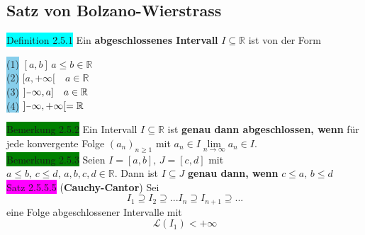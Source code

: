 \documentclass[landscape, 10pt]{article}
\newcommand{\R}{\mathbb{R}}
\begin{document}
\begin{multicols}{3}
       \subsection{Satz von Bolzano-Wierstrass}
              \colorbox{cyan}{Definition 2.5.1} 
                     Ein \textbf{abgeschlossenes Intervall} 
                     $I\subseteq\R$ ist von der Form
                     \begin{multicols}{2} %
                     \colorbox{SkyBlue}{(1)} 
                            $[a,b]\, a\leqslant b\in\R$\\
                     \colorbox{SkyBlue}{(2)}
                            $[a,+\infty[\quad a\in\R$\\
                     \colorbox{SkyBlue}{(3)}
                            $]\scalebox{0.75}[1.0]{\(-\)}\infty,a]\quad a\in\R$\\
                     \colorbox{SkyBlue}{(4)} 
                            $]\scalebox{0.75}[1.0]{\(-\)}\infty,+\infty[=\R$
                     \end{multicols}
              \colorbox{green}{Bemerkung 2.5.2} 
                     Ein Intervall $I\subseteq\R$ ist \textbf{genau dann 
                     abgeschlossen, wenn} für jede konvergente Folge 
                     $(a_n)_{n\geqslant1}$ 
                     mit \textcolor{NavyBlue}{
                     $a_n\in I$\quad$\lim\limits_{n\to\infty}a_n\in I$}.\\
              \colorbox{green}{Bemerkung 2.5.3}
                     Seien $I=[a,b],\,J=[c,d]$ mit \\
                     \textcolor{NavyBlue}{
                     $a\leqslant b,\,c\leqslant d,\,a,b,c,d\in\R$}. 
                     Dann ist 
                     \textcolor{NavyBlue}{$I\subseteq J$} \textbf{genau dann, 
                     wenn} \textcolor{NavyBlue}{$c\leqslant a,\,b\leqslant d$}\\
              \colorbox{magenta}{Satz 2.5.5.5} 
              (\textbf{Cauchy-Cantor}) 
                     Sei
                     \begin{equation*}
                            I_1\supseteq I_2\supseteq ...I_n\supseteq 
                            I_{n+1}\supseteq ...
                     \end{equation*}
                     eine Folge 
                     abgeschlossener Intervalle mit 
                     \begin{equation*}
                            \mathcal{L}(I_1)<+\infty

\end{equation*}
\end{multicols}
\end{document}
